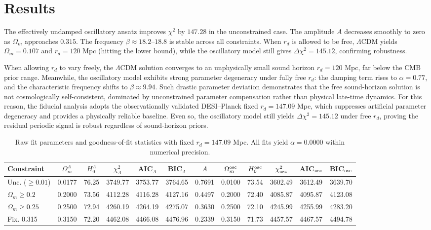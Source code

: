 \documentclass[10pt,a4paper]{article}
\begin{document}
\section{Results}
The effectively undamped oscillatory ansatz improves $\chi^2$ by $147.28$ in the unconstrained case. The amplitude $A$ decreases smoothly to zero as $\Omega_m$ approaches $0.315$. The frequency $\beta\approx18.2$–$18.8$ is stable across all constraints. When $r_d$ is allowed to be free, $\Lambda$CDM yields $\Omega_m=0.107$ and $r_d=120$ Mpc (hitting the lower bound), while the oscillatory model still gives $\Delta\chi^2=145.12$, confirming robustness.

When allowing $r_d$ to vary freely, the $\Lambda$CDM solution converges to an unphysically small sound horizon $r_d=120$ Mpc, far below the CMB prior range. Meanwhile, the oscillatory model exhibits strong parameter degeneracy under fully free $r_d$: the damping term rises to $\alpha=0.77$, and the characteristic frequency shifts to $\beta\approx9.94$. Such drastic parameter deviation demonstrates that the free sound-horizon solution is not cosmologically self-consistent, dominated by unconstrained parameter compensation rather than physical late-time dynamics. For this reason, the fiducial analysis adopts the observationally validated DESI–Planck fixed $r_d=147.09$ Mpc, which suppresses artificial parameter degeneracy and provides a physically reliable baseline. Even so, the oscillatory model still yields $\Delta\chi^2=145.12$ under free $r_d$, proving the residual periodic signal is robust regardless of sound-horizon priors.

\begin{table}[ht]
\centering
\renewcommand{\tabcolsep}{2.8pt}
\caption{\label{tab:fit_raw}Raw fit parameters and goodness-of-fit statistics with fixed $r_d=147.09$ Mpc. All fits yield $\alpha=0.0000$ within numerical precision.}
\begin{tabular}{lccccccccccc}
\toprule
Constraint & $\Omega_m^\Lambda$ & $H_0^\Lambda$ & $\chi^2_\Lambda$ & AIC$_\Lambda$ & BIC$_\Lambda$
& $A$ & $\Omega_m^{\rm osc}$ & $H_0^{\rm osc}$ & $\chi^2_{\rm osc}$ & AIC$_{\rm osc}$ & BIC$_{\rm osc}$ \\
\midrule
Unc. ($\ge0.01$)
& 0.0177 & 76.25 & 3749.77 & 3753.77 & 3764.65
& 0.7691 & 0.0100 & 73.54 & 3602.49 & 3612.49 & 3639.70 \\
$\Omega_m\ge0.2$
& 0.2000 & 73.56 & 4112.28 & 4116.28 & 4127.16
& 0.4497 & 0.2000 & 72.40 & 4085.87 & 4095.87 & 4123.08 \\
$\Omega_m\ge0.25$
& 0.2500 & 72.94 & 4260.19 & 4264.19 & 4275.07
& 0.3630 & 0.2500 & 72.10 & 4245.99 & 4255.99 & 4283.20 \\
Fix. 0.315
& 0.3150 & 72.20 & 4462.08 & 4466.08 & 4476.96
& 0.2339 & 0.3150 & 71.73 & 4457.57 & 4467.57 & 4494.78 \\
\bottomrule
\end{tabular}
\end{table}
\end{document}
